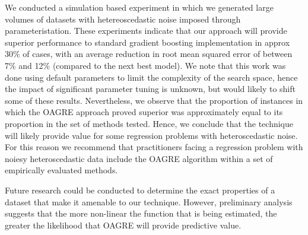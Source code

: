 \documentclass[graybox]{svmult}
\begin{document}
We conducted a simulation based experiment in which we generated large volumes of datasets with hetereoscedastic noise
imposed through parameteristation. These experiments indicate that our approach will provide superior
performance to standard gradient boosting implementation in approx 30\% of cases, with an average reduction in root mean
squared error of between 7\% and 12\% (compared to the next best model). 
We note that this work was done using default parameters to limit the complexity of the search space, hence the impact of 
significant parameter tuning is unknown, but would likely to shift some of these results. Nevertheless, we observe that the 
proportion of instances in which the OAGRE approach proved superior was approximately equal to its proportion in the set of 
methods tested. Hence, we conclude that the technique will likely provide value for some regression problems with heteroscedastic
noise. For this reason we recommend that practitioners facing a regression problem with noiesy heteroscedastic data include the
OAGRE algorithm within a set of empirically evaluated methods. 

Future research could be conducted to determine the exact properties of a dataset that make it amenable to our technique. 
However, preliminary analysis suggests that the more non-linear the function that is being estimated, the greater the likelihood that
OAGRE will provide predictive value.



\end{document}
